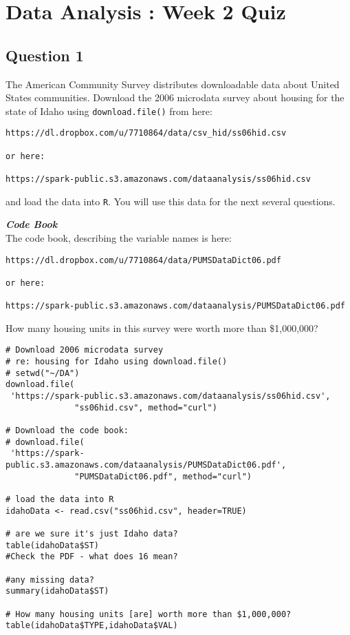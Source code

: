 \documentclass[]{article}
\begin{document}
\section{Data Analysis : Week 2 Quiz}





\newpage
\subsection*{Question 1}

The American Community Survey distributes downloadable data about United States communities. 
Download the 2006 microdata survey about housing for the state of Idaho using \texttt{download.file()} from here: 

\begin{verbatim}
https://dl.dropbox.com/u/7710864/data/csv_hid/ss06hid.csv

or here:

https://spark-public.s3.amazonaws.com/dataanalysis/ss06hid.csv 
\end{verbatim}
and load the data into \texttt{R}. You will use this data for the next several questions. 

\noindent \textbf{\textit{Code Book}}\\
The code book, describing the variable names is here: 

\begin{verbatim}
https://dl.dropbox.com/u/7710864/data/PUMSDataDict06.pdf

or here: 

https://spark-public.s3.amazonaws.com/dataanalysis/PUMSDataDict06.pdf
\end{verbatim}
\bigskip
How many housing units in this survey were worth more than \$1,000,000?

\begin{framed}
\begin{verbatim}
# Download 2006 microdata survey 
# re: housing for Idaho using download.file()
# setwd("~/DA")
download.file(
 'https://spark-public.s3.amazonaws.com/dataanalysis/ss06hid.csv',
              "ss06hid.csv", method="curl")

# Download the code book:
# download.file(
 'https://spark-public.s3.amazonaws.com/dataanalysis/PUMSDataDict06.pdf',
              "PUMSDataDict06.pdf", method="curl")

# load the data into R
idahoData <- read.csv("ss06hid.csv", header=TRUE)

# are we sure it's just Idaho data?
table(idahoData$ST)
#Check the PDF - what does 16 mean?

#any missing data?
summary(idahoData$ST)

# How many housing units [are] worth more than $1,000,000?
table(idahoData$TYPE,idahoData$VAL)
\end{verbatim}
\end{framed}
\end{document}
